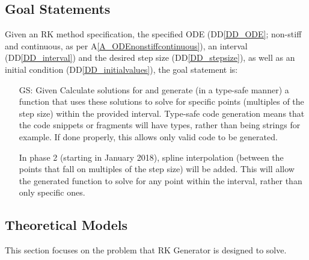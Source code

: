 \documentclass[12pt]{article}
\newcommand{\ddref}[1]{DD\ref{#1}}
\newcommand{\aref}[1]{A\ref{#1}}
\newcounter{goalnum} %
\newcommand{\famname}{RK Generator} %
\begin{document}
\subsection{Goal Statements}

\noindent Given an RK method specification, the specified ODE (\ddref{DD_ODE}; 
non-stiff and continuous, as 
per 
\aref{A_ODEnonstiffcontinuous}), an interval (\ddref{DD_interval}) and the 
desired step 
size (\ddref{DD_stepsize}), as well as 
an initial condition (\ddref{DD_initialvalues}), the goal statement is:

\begin{itemize}

\item[GS\refstepcounter{goalnum}\thegoalnum \label{G_meaningfulLabel}:] Given 
Calculate solutions for and generate (in a 
type-safe manner) a 
function that uses these solutions to solve for specific points (multiples of 
the step size) within the provided 
interval.
Type-safe code generation means that the code snippets or fragments will have 
types, rather than being strings for example. If done properly, this allows 
only valid code to be generated.

In phase 2 (starting in January 2018), spline interpolation (between the points 
that fall on multiples of the step size) will be added. This 
will allow the generated function to solve for any point within the interval, 
rather than only specific ones.
\end{itemize}


\subsection{Theoretical Models} \label{sec_theoretical}

This section focuses on the problem that \famname{} is designed to solve.

~\newline
\end{document}
